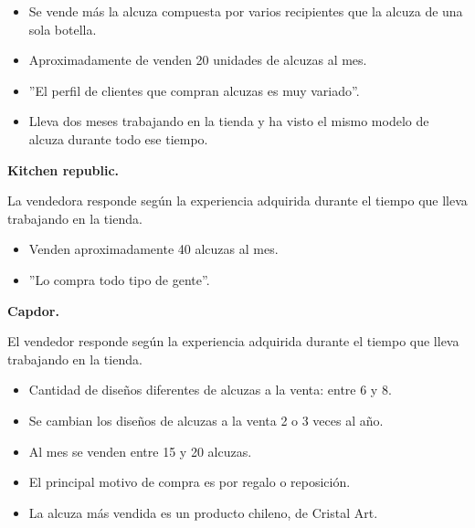 \begin{itemize}
\item Se vende más la alcuza compuesta por varios recipientes que la alcuza de una sola botella.
\item Aproximadamente de venden 20 unidades de alcuzas al mes.
\item ”El perfil de clientes que compran alcuzas es muy variado”.
\item Lleva dos meses trabajando en la tienda y ha visto el mismo modelo de alcuza durante todo ese tiempo.
\end{itemize}

\textbf{Kitchen republic.}

La vendedora responde según la experiencia adquirida durante el tiempo que lleva trabajando en la tienda.

\begin{itemize}
\item Venden aproximadamente 40 alcuzas al mes.
\item ”Lo compra todo tipo de gente”.
\end{itemize}

\textbf{Capdor.}

El vendedor responde según la experiencia adquirida durante el tiempo que lleva trabajando en la tienda.

\begin{itemize}
\item Cantidad de diseños diferentes de alcuzas a la venta: entre 6 y 8.
\item Se cambian los diseños de alcuzas a la venta 2 o 3 veces al año.
\item Al mes se venden entre 15 y 20 alcuzas.
\item El principal motivo de compra es por regalo o reposición.
\item La alcuza más vendida es un producto chileno, de Cristal Art.
\end{itemize}
